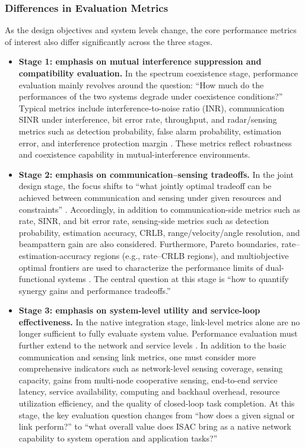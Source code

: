 \subsubsection{Differences in Evaluation Metrics}
\label{subsubsec:ch1-metric-differences}

As the design objectives and system levels change, the core performance metrics of interest also differ significantly across the three stages.
\begin{itemize}
    \item \textbf{Stage 1: emphasis on mutual interference suppression and compatibility evaluation.}  
    In the spectrum coexistence stage, performance evaluation mainly revolves around the question: ``How much do the performances of the two systems degrade under coexistence conditions?'' Typical metrics include interference-to-noise ratio (INR), communication SINR under interference, bit error rate, throughput, and radar/sensing metrics such as detection probability, false alarm probability, estimation error, and interference protection margin \cite{Chiriyath2017RadarCommCoexistence,Blunt2018RadarSpectrumSharing}. These metrics reflect robustness and coexistence capability in mutual-interference environments.
    
    \item \textbf{Stage 2: emphasis on communication--sensing tradeoffs.}  
    In the joint design stage, the focus shifts to ``what jointly optimal tradeoff can be achieved between communication and sensing under given resources and constraints'' \cite{Liu2020JointRadarComm,Liu2022ISAC}. Accordingly, in addition to communication-side metrics such as rate, SINR, and bit error rate, sensing-side metrics such as detection probability, estimation accuracy, CRLB, range/velocity/angle resolution, and beampattern gain are also considered. Furthermore, Pareto boundaries, rate--estimation-accuracy regions (e.g., rate--CRLB regions), and multiobjective optimal frontiers are used to characterize the performance limits of dual-functional systems \cite{Zhang2021ISAC6G}. The central question at this stage is ``how to quantify synergy gains and performance tradeoffs.''
    
    \item \textbf{Stage 3: emphasis on system-level utility and service-loop effectiveness.}  
    In the native integration stage, link-level metrics alone are no longer sufficient to fully evaluate system value. Performance evaluation must further extend to the network and service levels \cite{Zhang2020perceptive,Cui2024integrated}. In addition to the basic communication and sensing link metrics, one must consider more comprehensive indicators such as network-level sensing coverage, sensing capacity, gains from multi-node cooperative sensing, end-to-end service latency, service availability, computing and backhaul overhead, resource utilization efficiency, and the quality of closed-loop task completion. At this stage, the key evaluation question changes from ``how does a given signal or link perform?'' to ``what overall value does ISAC bring as a native network capability to system operation and application tasks?''
\end{itemize}

